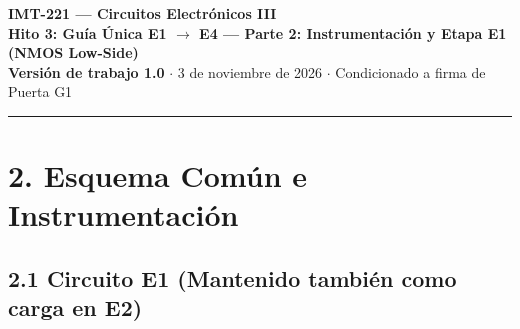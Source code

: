 \documentclass[10pt, a4paper, landscape]{article}
\begin{document}
\noindent
{\LARGE \textbf{\textcolor{ucbblue}{IMT-221 — Circuitos Electrónicos III}}}\\[0.15cm]
{\Large \textbf{Hito 3: Guía Única E1 $\rightarrow$ E4 — Parte 2: Instrumentación y Etapa E1 (NMOS Low-Side)}}\\[0.1cm]
{\small \textbf{Versión de trabajo 1.0} $\cdot$ 3 de noviembre de 2026 $\cdot$ Condicionado a firma de Puerta G1}
\par\vspace{0.2cm}\noindent\rule{\linewidth}{0.4pt}\vspace{0.3cm}

\section*{2. Esquema Común e Instrumentación}

\subsection*{2.1 Circuito E1 (Mantenido también como carga en E2)}
\end{document}
